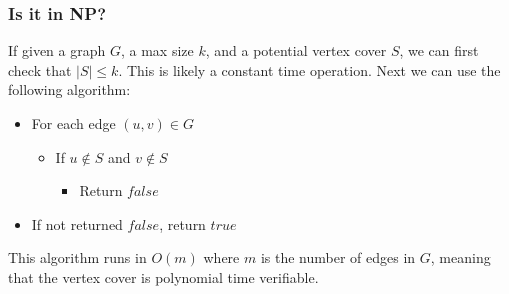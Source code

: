     \subsubsection{Is it in NP?}
        If given a graph $G$, a max size $k$, and a potential vertex cover $S$, we can first check that $|S| \leq k$. This is likely a constant time operation. Next we can use the following algorithm: 
        \begin{itemize}[noitemsep]
            \setlength{\itemindent}{1.25in}
            \item For each edge $(u,v) \in G$
            \begin{itemize}
                \setlength{\itemindent}{1.25in}
                \item If $u \notin S$ and $v \notin S$
                \begin{itemize}
                    \setlength{\itemindent}{1.25in}
                    \item Return $false$
                \end{itemize}
            \end{itemize}
            \item If not returned $false$, return $true$
        \end{itemize}
        This algorithm runs in $O(m)$ where $m$ is the number of edges in $G$, meaning that the vertex cover is polynomial time verifiable.
